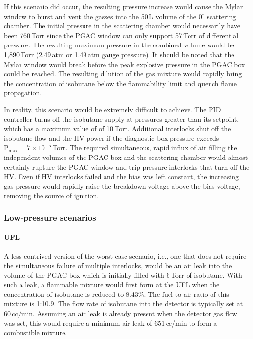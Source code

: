If this scenario did occur, the resulting pressure increase would cause %
the Mylar window to burst 
and vent the gasses into the 50\,L volume of the $0^{\circ}$ scattering chamber. The initial pressure in the scattering chamber would necessarily have been 760\,Torr %
since the PGAC window can only support 57\,Torr of %
 differential pressure. The resulting maximum pressure in the combined volume would be
 1,890\,Torr (2.49\,atm or 1.49\,atm gauge pressure).
 It should be noted that the Mylar window would break before the peak explosive pressure in the PGAC box could be reached.  The resulting dilution of the gas mixture would rapidly bring the concentration of isobutane below the flammability limit and quench flame propagation.

In reality, this scenario would be extremely difficult to achieve. The PID controller turns off the isobutane supply at pressures greater than its setpoint, which has a maximum value of of 10\,Torr.  Additional interlocks shut off the isobutane flow and the HV power if the diagnostic box pressure exceeds $\textrm{P}_\textrm{max}=7\times10^{-5}$\,Torr.  The required simultaneous, rapid influx of air filling the independent volumes of the PGAC box and the scattering chamber would almost certainly rupture the PGAC window and trip pressure interlocks that turn off the HV.  Even if HV interlocks failed and the bias was left constant, the increasing gas pressure would rapidly raise the breakdown voltage above the bias voltage, removing the source of ignition. %

\subsubsection{Low-pressure scenarios}
\label{low_pres}
\paragraph{UFL} A less contrived version of the worst-case scenario, i.e., one that does not require the simultaneous failure of multiple interlocks, would be an %
air leak into the volume of the PGAC box which is initially filled with 6\,Torr of isobutane.  With such a leak, %
a flammable mixture would first form at the UFL when the concentration of isobutane is reduced to 8.43\%.  The fuel-to-air ratio of this mixture is 1:10.9.  The flow rate of isobutane into the detector is typically set at 60\,cc/min.
 Assuming an air leak is already present when the detector gas flow was set, this would require a minimum air leak of 651\,cc/min
to form a combustible mixture.  

